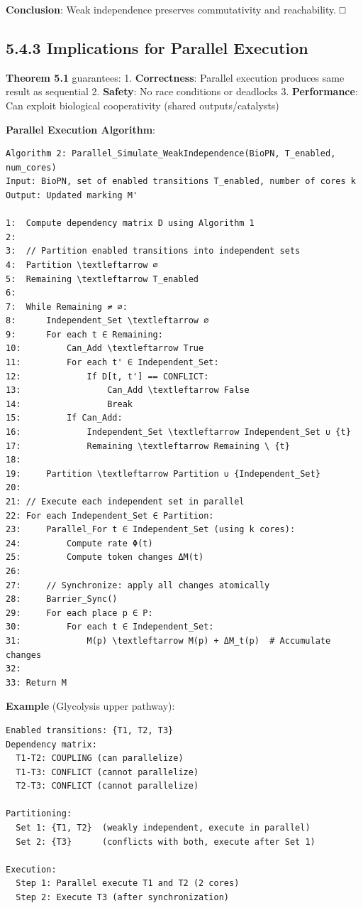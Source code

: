 \textbf{Conclusion}: Weak independence preserves commutativity and
reachability. □

\hypertarget{implications-for-parallel-execution}{%
\subsection{5.4.3 Implications for Parallel
Execution}\label{implications-for-parallel-execution}}

\textbf{Theorem 5.1} guarantees: 1. \textbf{Correctness}: Parallel
execution produces same result as sequential 2. \textbf{Safety}: No race
conditions or deadlocks 3. \textbf{Performance}: Can exploit biological
cooperativity (shared outputs/catalysts)

\textbf{Parallel Execution Algorithm}:

\begin{lstlisting}
Algorithm 2: Parallel_Simulate_WeakIndependence(BioPN, T_enabled, num_cores)
Input: BioPN, set of enabled transitions T_enabled, number of cores k
Output: Updated marking M'

1:  Compute dependency matrix D using Algorithm 1
2:  
3:  // Partition enabled transitions into independent sets
4:  Partition \textleftarrow ∅
5:  Remaining \textleftarrow T_enabled
6:  
7:  While Remaining ≠ ∅:
8:      Independent_Set \textleftarrow ∅
9:      For each t ∈ Remaining:
10:         Can_Add \textleftarrow True
11:         For each t' ∈ Independent_Set:
12:             If D[t, t'] == CONFLICT:
13:                 Can_Add \textleftarrow False
14:                 Break
15:         If Can_Add:
16:             Independent_Set \textleftarrow Independent_Set ∪ {t}
17:             Remaining \textleftarrow Remaining \ {t}
18:     
19:     Partition \textleftarrow Partition ∪ {Independent_Set}
20: 
21: // Execute each independent set in parallel
22: For each Independent_Set ∈ Partition:
23:     Parallel_For t ∈ Independent_Set (using k cores):
24:         Compute rate Φ(t)
25:         Compute token changes ΔM(t)
26:     
27:     // Synchronize: apply all changes atomically
28:     Barrier_Sync()
29:     For each place p ∈ P:
30:         For each t ∈ Independent_Set:
31:             M(p) \textleftarrow M(p) + ΔM_t(p)  # Accumulate changes
32: 
33: Return M
\end{lstlisting}

\textbf{Example} (Glycolysis upper pathway):

\begin{lstlisting}
Enabled transitions: {T1, T2, T3}
Dependency matrix:
  T1-T2: COUPLING (can parallelize)
  T1-T3: CONFLICT (cannot parallelize)
  T2-T3: CONFLICT (cannot parallelize)

Partitioning:
  Set 1: {T1, T2}  (weakly independent, execute in parallel)
  Set 2: {T3}      (conflicts with both, execute after Set 1)

Execution:
  Step 1: Parallel execute T1 and T2 (2 cores)
  Step 2: Execute T3 (after synchronization)
\end{lstlisting}


